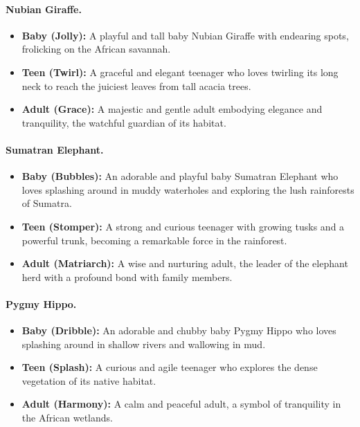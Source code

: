 \paragraph{Nubian Giraffe.}
\begin{itemize}[nosep]
\item \textbf{Baby (Jolly):} A playful and tall baby Nubian Giraffe with endearing spots, frolicking on the African savannah.
\item \textbf{Teen (Twirl):} A graceful and elegant teenager who loves twirling its long neck to reach the juiciest leaves from tall acacia trees.
\item \textbf{Adult (Grace):} A majestic and gentle adult embodying elegance and tranquility, the watchful guardian of its habitat.
\end{itemize}

\paragraph{Sumatran Elephant.}
\begin{itemize}[nosep]
\item \textbf{Baby (Bubbles):} An adorable and playful baby Sumatran Elephant who loves splashing around in muddy waterholes and exploring the lush rainforests of Sumatra.
\item \textbf{Teen (Stomper):} A strong and curious teenager with growing tusks and a powerful trunk, becoming a remarkable force in the rainforest.
\item \textbf{Adult (Matriarch):} A wise and nurturing adult, the leader of the elephant herd with a profound bond with family members.
\end{itemize}

\paragraph{Pygmy Hippo.}
\begin{itemize}[nosep]
\item \textbf{Baby (Dribble):} An adorable and chubby baby Pygmy Hippo who loves splashing around in shallow rivers and wallowing in mud.
\item \textbf{Teen (Splash):} A curious and agile teenager who explores the dense vegetation of its native habitat.
\item \textbf{Adult (Harmony):} A calm and peaceful adult, a symbol of tranquility in the African wetlands.
\end{itemize}

